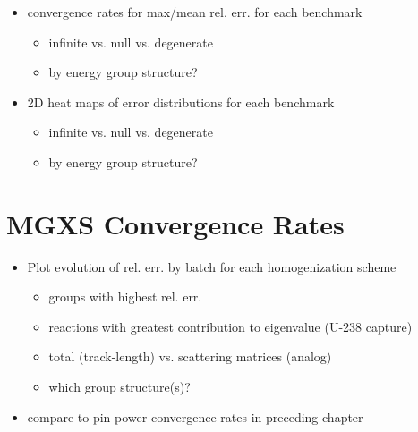 \begin{itemize}[noitemsep]
  \item convergence rates for max/mean rel. err. for each benchmark
  \begin{itemize}[noitemsep]
    \item infinite vs. null vs. degenerate
    \item by energy group structure?
  \end{itemize}
  \item 2D heat maps of error distributions for each benchmark
  \begin{itemize}[noitemsep]
    \item infinite vs. null vs. degenerate
    \item by energy group structure?
  \end{itemize}
\end{itemize}


\section{MGXS Convergence Rates}
\label{sec:chap8-mgxs-converge}

\begin{itemize}[noitemsep]
  \item Plot evolution of rel. err. by batch for each homogenization scheme
  \begin{itemize}[noitemsep]
    \item groups with highest rel. err.
    \item reactions with greatest contribution to eigenvalue (U-238 capture)
    \item total (track-length) vs. scattering matrices (analog)    
    \item which group structure(s)?
 \end{itemize}
  \item compare to pin power convergence rates in preceding chapter
\end{itemize}

